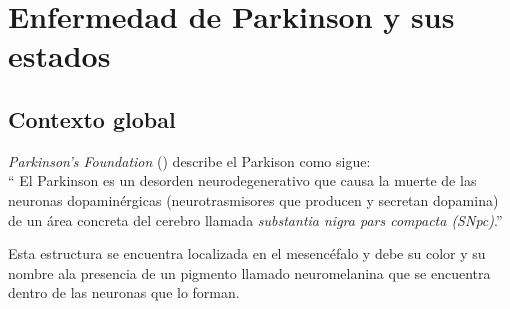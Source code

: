 \section{Enfermedad de Parkinson y sus estados}

\subsection{Contexto global}

\textit{Parkinson's Foundation} (\cite{pf}) describe el Parkison como sigue: \\

`` El Parkinson es un desorden neurodegenerativo que causa la muerte de las neuronas dopaminérgicas (neurotrasmisores que producen y secretan dopamina) de un área concreta del cerebro llamada \textit{substantia nigra pars compacta (SNpc)}.''

Esta estructura se encuentra localizada en el mesencéfalo y debe su color y su nombre ala presencia de un pigmento llamado neuromelanina que se encuentra dentro de las neuronas que lo forman. 

